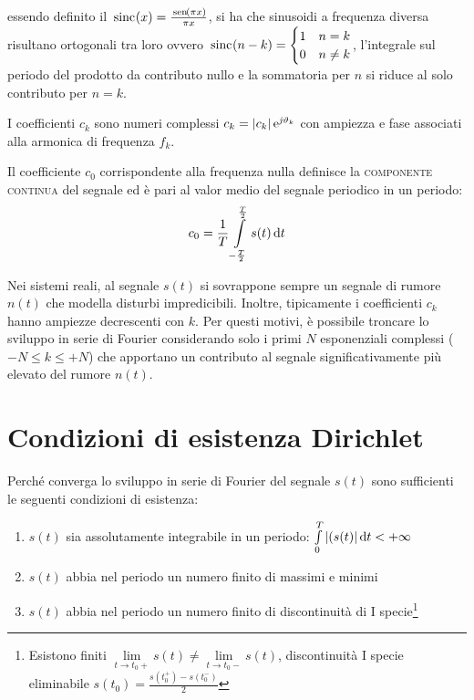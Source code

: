 essendo definito il $\,{\operatorname{sinc}}^{}\!\left({x}\right)=\frac{\,{\operatorname{sen}}^{}\!\left({\pi x}\right)}{\pi x}$, si ha che sinusoidi a frequenza diversa risultano ortogonali tra loro ovvero 
$\,{\operatorname{sinc}}^{}\!\left({n-k}\right)=\begin{cases} 1 & n=k \\ 0 & n\neq k\end{cases}$, l'integrale sul periodo del prodotto da contributo nullo e la sommatoria per $n$ si riduce al solo contributo per $n=k$.

I coefficienti $c_k$ sono numeri complessi $c_k=\left|{c_k}\right|\operatorname{e}^{\operatorname{\mathit{j}\!}\vartheta_k}$ con ampiezza e fase associati alla armonica di frequenza $f_k$.

Il coefficiente $c_0$ corrispondente alla frequenza nulla definisce la \textsc{componente continua} del segnale ed è pari al valor medio del segnale periodico in un periodo:
\begin{equation}c_0=\frac{1}{T}\int\limits_{-\frac{T}{2}}^{\frac{T}{2}}{s(t)}{\,\mathop{}\!\mathrm{d}{t}} \end{equation}

\begin{nota}Nei sistemi reali, al segnale $s(t)$ si sovrappone sempre un segnale di rumore $n(t)$ che modella disturbi impredicibili. Inoltre, tipicamente i coefficienti $c_k$ hanno ampiezze decrescenti con $k$. Per questi motivi, è possibile troncare lo sviluppo in serie di Fourier considerando solo i primi $N$ esponenziali complessi ($-N\leq k \leq +N$) che apportano un contributo al segnale significativamente più elevato del rumore $n(t)$.\end{nota}

\section{Condizioni di esistenza Dirichlet}
Perché converga lo sviluppo in serie di Fourier del segnale $s(t)$ sono sufficienti le seguenti condizioni di esistenza:
\begin{enumerate}
\item $s(t)$ sia assolutamente integrabile in un periodo: $\int\limits_{0}^{T}{\left|{(s(t)}\right|}{\,\mathop{}\!\mathrm{d}{t}}<+\infty$
\item $s(t)$ abbia nel periodo un numero finito di massimi e minimi
\item $s(t)$ abbia nel periodo un numero finito di discontinuità di I specie\footnote{Esistono finiti $\lim\limits_{t\to t_0+}s(t)\neq\lim\limits_{t\to t_0-}s(t)$, discontinuità I specie eliminabile $s(t_0)=\frac{s(t_0^+)-s(t_0^-)}{2}$}
\end{enumerate}

